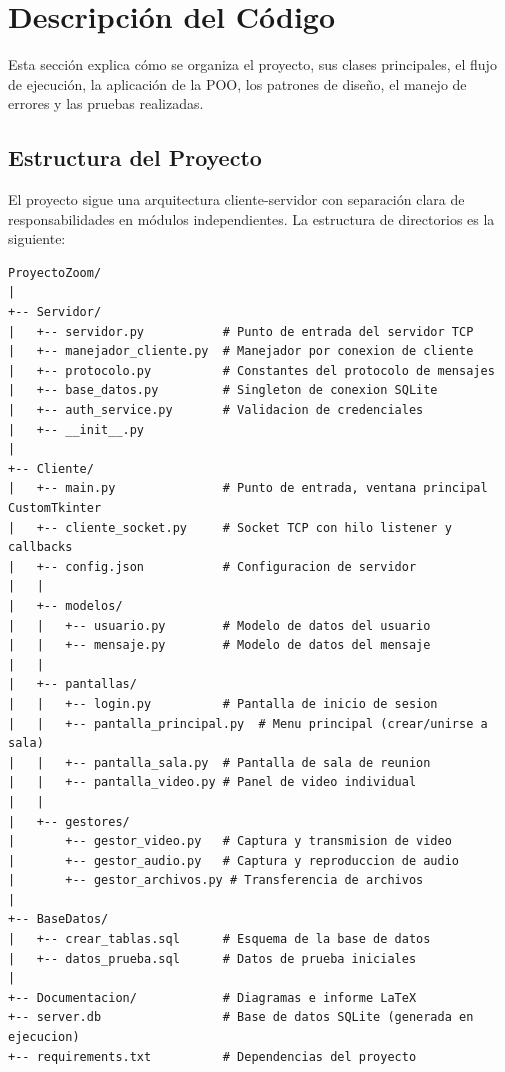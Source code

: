 \documentclass[12pt,a4paper]{article}
\begin{document}
\section{Descripci\'on del C\'odigo}

Esta secci\'on explica c\'omo se organiza el proyecto, sus clases principales, el flujo de ejecuci\'on, la aplicaci\'on de la POO, los patrones de dise\~no, el manejo de errores y las pruebas realizadas.

\subsection{Estructura del Proyecto}

El proyecto sigue una arquitectura cliente-servidor con separaci\'on clara de responsabilidades en m\'odulos independientes. La estructura de directorios es la siguiente:

\begin{lstlisting}[frame=single, basicstyle=\footnotesize\ttfamily, numbers=none]
ProyectoZoom/
|
+-- Servidor/
|   +-- servidor.py           # Punto de entrada del servidor TCP
|   +-- manejador_cliente.py  # Manejador por conexion de cliente
|   +-- protocolo.py          # Constantes del protocolo de mensajes
|   +-- base_datos.py         # Singleton de conexion SQLite
|   +-- auth_service.py       # Validacion de credenciales
|   +-- __init__.py
|
+-- Cliente/
|   +-- main.py               # Punto de entrada, ventana principal CustomTkinter
|   +-- cliente_socket.py     # Socket TCP con hilo listener y callbacks
|   +-- config.json           # Configuracion de servidor
|   |
|   +-- modelos/
|   |   +-- usuario.py        # Modelo de datos del usuario
|   |   +-- mensaje.py        # Modelo de datos del mensaje
|   |
|   +-- pantallas/
|   |   +-- login.py          # Pantalla de inicio de sesion
|   |   +-- pantalla_principal.py  # Menu principal (crear/unirse a sala)
|   |   +-- pantalla_sala.py  # Pantalla de sala de reunion
|   |   +-- pantalla_video.py # Panel de video individual
|   |
|   +-- gestores/
|       +-- gestor_video.py   # Captura y transmision de video
|       +-- gestor_audio.py   # Captura y reproduccion de audio
|       +-- gestor_archivos.py # Transferencia de archivos
|
+-- BaseDatos/
|   +-- crear_tablas.sql      # Esquema de la base de datos
|   +-- datos_prueba.sql      # Datos de prueba iniciales
|
+-- Documentacion/            # Diagramas e informe LaTeX
+-- server.db                 # Base de datos SQLite (generada en ejecucion)
+-- requirements.txt          # Dependencias del proyecto
\end{lstlisting}
\end{document}
